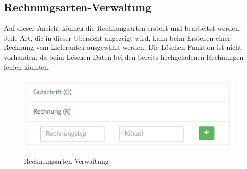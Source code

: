 \subsection{Rechnungsarten-Verwaltung}
Auf dieser Ansicht können die Rechnungsarten erstellt und bearbeitet werden. Jede Art, die in dieser Übersicht angezeigt wird, kann beim Erstellen einer Rechnung vom Lieferanten ausgewählt werden. Die Löschen-Funktion ist nicht vorhanden, da beim Löschen Daten bei den bereits hochgeladenen Rechnungen fehlen könnten.
\begin{figure}[!h]
    \centering
    \includegraphics[width=15cm]{figures/rechnungsarten.png}
    \label{fig:rechnungsartenverwaltung}
    \caption{Rechnungsarten-Verwaltung}
\end{figure}
\newpage
